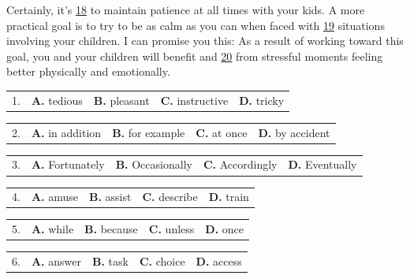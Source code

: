 \documentclass[UTF8,11pt]{ctexart}
\begin{document}
Certainly, it’s \uline{18} to maintain patience at all times with your kids. A more practical goal is to try to be as calm as you can when faced with \uline{19} situations involving your children. I can promise you this: As a result of working toward this goal, you and your children will benefit and \uline{20} from stressful moments feeling better physically and emotionally.


\noindent\begin{tabularx}{\linewidth}{@{}lXXXX@{}}1. & \textbf{A.} tedious & \textbf{B.} pleasant & \textbf{C.} instructive & \textbf{D.} tricky\\\end{tabularx}\par

\noindent\begin{tabularx}{\linewidth}{@{}lXXXX@{}}2. & \textbf{A.} in addition & \textbf{B.} for example & \textbf{C.} at once & \textbf{D.} by accident\\\end{tabularx}\par

\noindent\begin{tabularx}{\linewidth}{@{}lXXXX@{}}3. & \textbf{A.} Fortunately & \textbf{B.} Occasionally & \textbf{C.} Accordingly & \textbf{D.} Eventually\\\end{tabularx}\par

\noindent\begin{tabularx}{\linewidth}{@{}lXXXX@{}}4. & \textbf{A.} amuse & \textbf{B.} assist & \textbf{C.} describe & \textbf{D.} train\\\end{tabularx}\par

\noindent\begin{tabularx}{\linewidth}{@{}lXXXX@{}}5. & \textbf{A.} while & \textbf{B.} because & \textbf{C.} unless & \textbf{D.} once\\\end{tabularx}\par

\noindent\begin{tabularx}{\linewidth}{@{}lXXXX@{}}6. & \textbf{A.} answer & \textbf{B.} task & \textbf{C.} choice & \textbf{D.} access\\\end{tabularx}\par
\end{document}
